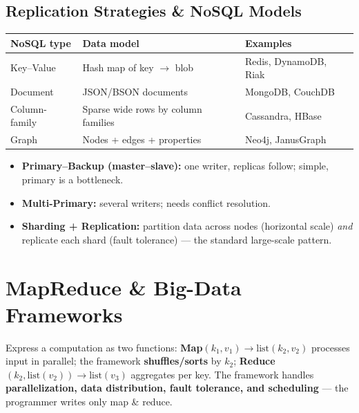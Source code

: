 \documentclass[11pt,a4paper]{article}
\begin{document}
\subsection{Replication Strategies \& NoSQL Models}
\begin{longtable}{@{}p{3.5cm}p{4.6cm}p{5.4cm}@{}}
\toprule
\rowcolor{primary!15}
\textbf{NoSQL type} & \textbf{Data model} & \textbf{Examples} \\
\midrule
\endhead
Key--Value & Hash map of key $\to$ blob & Redis, DynamoDB, Riak \\
Document & JSON/BSON documents & MongoDB, CouchDB \\
Column-family & Sparse wide rows by column families & Cassandra, HBase \\
Graph & Nodes + edges + properties & Neo4j, JanusGraph \\
\bottomrule
\end{longtable}

\begin{itemize}[leftmargin=*, itemsep=2pt]
  \item \textbf{Primary--Backup (master--slave):} one writer, replicas follow; simple, primary is a bottleneck.
  \item \textbf{Multi-Primary:} several writers; needs conflict resolution.
  \item \textbf{Sharding + Replication:} partition data across nodes (horizontal scale) \emph{and} replicate each shard (fault tolerance) --- the standard large-scale pattern.
\end{itemize}

\section{MapReduce \& Big-Data Frameworks}

\begin{conceptbox}
Express a computation as two functions: \textbf{Map}$(k_1,v_1) \to \text{list}(k_2,v_2)$ processes input in parallel; the framework \textbf{shuffles/sorts} by $k_2$; \textbf{Reduce}$(k_2,\text{list}(v_2)) \to \text{list}(v_3)$ aggregates per key. The framework handles \textbf{parallelization, data distribution, fault tolerance, and scheduling} --- the programmer writes only map \& reduce.
\end{conceptbox}
\end{document}
